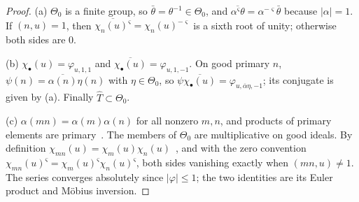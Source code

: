 \documentclass[11pt]{article}
\numberwithin{equation}{section}
\begin{document}
\begin{proof}
(a) $\Theta_0$ is a finite group, so $\bar\theta=\theta^{-1}\in\Theta_0$, and
$\overline{\alpha^\varsigma\theta}=\alpha^{-\varsigma}\bar\theta$ because $|\alpha|=1$. If $(n,u)=1$, then
$\overline{\chi_n(u)^\varsigma}=\chi_n(u)^{-\varsigma}$ is a sixth root of unity; otherwise both sides are $0$.

(b) $\chi_\bullet(u)=\varphi_{u,1,1}$ and $\overline{\chi_\bullet(u)}=\varphi_{u,1,-1}$. On good primary $n$,
$\psi(n)=\overline{\alpha(n)}\eta(n)$ with $\eta\in\Theta_0$, so
$\psi\overline{\chi_\bullet(u)}=\varphi_{u,\overline\alpha\eta,-1}$; its conjugate is given by (a). Finally
$\widehat T\subset\Theta_0$.

(c) $\alpha(mn)=\alpha(m)\alpha(n)$ for all nonzero $m,n$, and products of primary elements are
primary~\cite[Section~4.1]{OAI78}. The members of $\Theta_0$ are multiplicative on good ideals. By
definition $\chi_{mn}(u)=\chi_m(u)\chi_n(u)$~\cite[Section~4.1]{OAI78}, and with the zero convention
$\chi_{mn}(u)^\varsigma=\chi_m(u)^\varsigma\chi_n(u)^\varsigma$, both sides vanishing exactly when
$(mn,u)\ne1$. The series converges absolutely since $|\varphi|\le1$; the two identities are its
Euler product and M\"obius inversion.


\end{proof}
\end{document}
